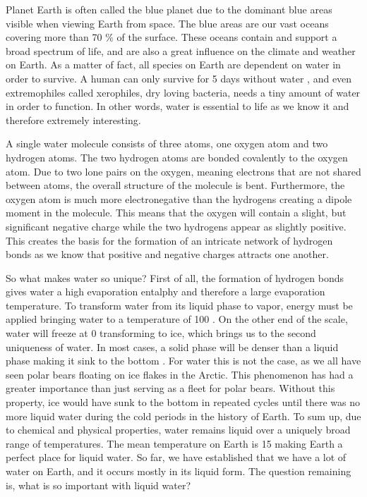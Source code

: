 



Planet Earth is often called the blue planet due to the dominant blue areas visible when viewing Earth from space. 
The blue areas are our vast oceans covering more than 70 \% \cite{WikiEarth} of the surface. 
These oceans contain and support a broad spectrum of life, and are also a great influence on the climate and weather on Earth. 
As a matter of fact, all species on Earth are dependent on water in order to survive. 
A human can only survive for 5 days without water \cite{SurviveWater}, and even extremophiles called xerophiles, dry loving bacteria, needs a tiny amount of water in order to function. 
In other words, water is essential to life as we know it and therefore extremely interesting. 

A single water molecule consists of three atoms, one oxygen atom and two hydrogen atoms. 
The two hydrogen atoms are bonded covalently to the oxygen atom. 
Due to two lone pairs on the oxygen, meaning electrons that are not shared between atoms, the overall structure of the molecule is bent. 
Furthermore, the oxygen atom is much more electronegative than the hydrogens creating a dipole moment in the molecule. 
This means that the oxygen will contain a slight, but significant negative charge while the two hydrogens appear as slightly positive. 
This creates the basis for the formation of an intricate network of hydrogen bonds as we know that positive and negative charges attracts one another.  

So what makes water so unique? 
First of all, the formation of hydrogen bonds gives water a high evaporation entalphy and therefore a large evaporation temperature. 
To transform water from its liquid phase to vapor, energy must be applied bringing water to a temperature of 100 \textcelsius. 
On the other end of the scale, water will freeze at 0 \textcelsius transforming to ice, which brings us to the second uniqueness of water. 
In most cases, a solid phase will be denser than a liquid phase making it sink to the bottom \cite{SolidWater}. 
For water this is not the case, as we all have seen polar bears floating on ice flakes in the Arctic. 
This phenomenon has had a greater importance than just serving as a fleet for polar bears. 
Without this property, ice would have sunk to the bottom in repeated cycles until there was no more liquid water during the cold periods in the history of Earth. 
To sum up, due to chemical and physical properties, water remains liquid over a uniquely broad range of temperatures. 
The mean temperature on Earth is 15 \textcelsius \cite{WikiEarth} making Earth a perfect place for liquid water. 
So far, we have established that we have a lot of water on Earth, and it occurs mostly in its liquid form. 
The question remaining is, what is so important with liquid water? 

